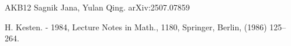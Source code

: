 \documentclass[12 pt]{amsart}
\theoremstyle{definition}
\theoremstyle{remark}
\begin{document}
\begin{thebibliography}{AKB12}
Sagnik Jana, Yulan Qing.
  arXiv:2507.07859

H. Kesten. 
- 1984, Lecture Notes in Math., 1180, Springer, Berlin, (1986) 125–264.

















\end{thebibliography}
\end{document}
